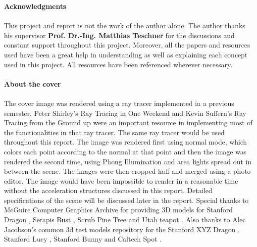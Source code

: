 \documentclass[11pt,a4paper]{article}
\begin{document}
\noindent
\textbf{\Large{Acknowledgments}}
\\~\\
This project and report is not the work of the author alone. The author thanks his supervisor \textbf{Prof.
	Dr.-Ing. Matthias Teschner} for the discussions and constant support throughout this project. Moreover, all the papers and resources used have been a great help in understanding as well as explaining each concept used in this project. All resources have been referenced wherever necessary.
\\~\\
\noindent
\textbf{\Large{About the cover}}
\\~\\
The cover image was rendered using a ray tracer implemented in a previous semester. Peter Shirley's Ray Tracing in One Weekend \cite{Shirley2020RTW1} and Kevin Suffern's Ray Tracing from the Ground up \cite{suffern2016ray} were an important resource in implementing most of the functionalities in that ray tracer. The same ray tracer would be used throughout this report. The image was rendered first using normal mode, which colors each point according to the normal at that point and then the image was rendered the second time, using Phong Illumination and area lights spread out in between the scene. The images were then cropped half and merged using a photo editor. The image would have been impossible to render in a reasonable time without the acceleration structures discussed in this report. Detailed specifications of the scene will be discussed later in the report. Special thanks to McGuire Computer Graphics Archive \cite{McGuire2017Data} for providing 3D models for Stanford Dragon \cite{stanforddragon}, Serapis Bust \cite{serapis}, Scrub Pine Tree \cite{pinetree} and Utah teapot \cite{utahteapot}. Also thanks to Alec Jacobson's common 3d test models repository \cite{common3dmodels} for the Stanford XYZ Dragon \cite{stanfordxyzdragon}, Stanford Lucy \cite{stanfordlucy}, Stanford Bunny \cite{stanfordbunny} and Caltech Spot \cite{spot}.

\pagebreak
\tableofcontents
\pagebreak
\end{document}
